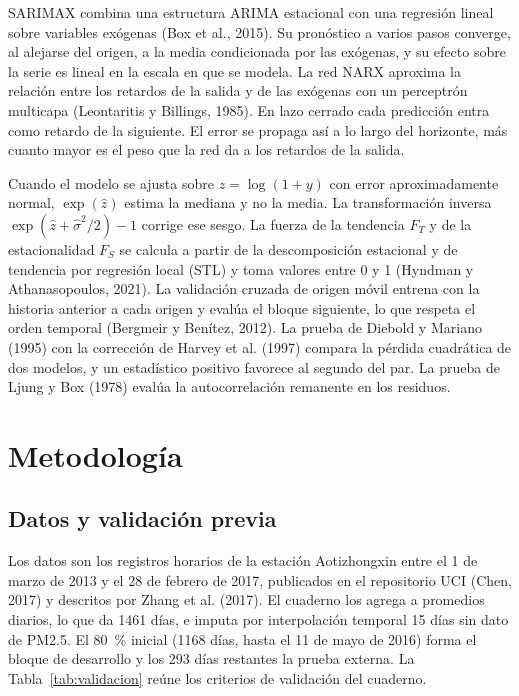 \documentclass[11pt,letterpaper]{article}
\begin{document}
SARIMAX combina una estructura ARIMA estacional con una regresión lineal sobre variables exógenas (Box et al., 2015). Su pronóstico a varios pasos converge, al alejarse del origen, a la media condicionada por las exógenas, y su efecto sobre la serie es lineal en la escala en que se modela. La red NARX aproxima la relación entre los retardos de la salida y de las exógenas con un perceptrón multicapa (Leontaritis y Billings, 1985). En lazo cerrado cada predicción entra como retardo de la siguiente. El error se propaga así a lo largo del horizonte, más cuanto mayor es el peso que la red da a los retardos de la salida.

Cuando el modelo se ajusta sobre $z=\log(1+y)$ con error aproximadamente normal, $\exp(\hat z)$ estima la mediana y no la media. La transformación inversa $\exp(\hat z+\hat\sigma^2/2)-1$ corrige ese sesgo. La fuerza de la tendencia $F_T$ y de la estacionalidad $F_S$ se calcula a partir de la descomposición estacional y de tendencia por regresión local (STL) y toma valores entre 0 y 1 (Hyndman y Athanasopoulos, 2021). La validación cruzada de origen móvil entrena con la historia anterior a cada origen y evalúa el bloque siguiente, lo que respeta el orden temporal (Bergmeir y Benítez, 2012). La prueba de Diebold y Mariano (1995) con la corrección de Harvey et al. (1997) compara la pérdida cuadrática de dos modelos, y un estadístico positivo favorece al segundo del par. La prueba de Ljung y Box (1978) evalúa la autocorrelación remanente en los residuos.

\section{Metodología}

\subsection{Datos y validación previa}

Los datos son los registros horarios de la estación Aotizhongxin entre el 1 de marzo de 2013 y el 28 de febrero de 2017, publicados en el repositorio UCI (Chen, 2017) y descritos por Zhang et al. (2017). El cuaderno los agrega a promedios diarios, lo que da 1461 días, e imputa por interpolación temporal 15 días sin dato de PM2.5. El 80~\% inicial (1168 días, hasta el 11 de mayo de 2016) forma el bloque de desarrollo y los 293 días restantes la prueba externa. La Tabla~\ref{tab:validacion} reúne los criterios de validación del cuaderno.
\end{document}
